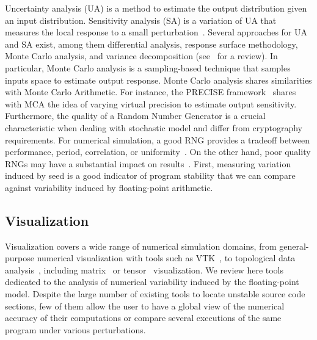 \documentclass[11pt]{article}
\begin{document}
Uncertainty analysis (UA) is a method to estimate the output distribution given an input distribution.
Sensitivity analysis (SA) is a variation of UA that measures the local response to a small perturbation~\cite{loucks2017water}. 
Several approaches for UA and SA exist, among them differential analysis, response surface methodology, Monte Carlo analysis, and variance decomposition (see~\cite{helton2006survey} for a review). In particular, Monte Carlo analysis is a sampling-based technique that samples inputs space to estimate output response. Monte Carlo analysis shares similarities with Monte Carlo Arithmetic. For instance, the PRECISE framework~\cite{chaitin1996lectures} shares with MCA the idea of varying virtual precision to estimate output sensitivity.
Furthermore, the quality of a Random Number Generator is a crucial characteristic when dealing with stochastic model and differ from cryptography requirements. For numerical simulation, a good RNG provides a tradeoff between performance, period, correlation, or uniformity~\cite{james2020review}. On the other hand, poor quality RNGs may have a substantial impact on results~\cite{click2011quality}. First, measuring variation induced by seed is a good indicator of program stability that we can compare against variability induced by floating-point arithmetic.


\subsection{Visualization}

Visualization covers a wide range of numerical simulation domains, from general-purpose numerical visualization with tools
such as VTK~\cite{schroeder2000visualizing}, to topological data analysis~\cite{tierny2018topological}, including matrix~\cite{wu2008matrix} or tensor~\cite{kindlmann2006diffusion} visualization.
We review here tools dedicated to the analysis of numerical variability induced by the floating-point model. Despite the large number of existing tools  to locate unstable source code sections, few of them allow the user to have a global view of the numerical accuracy of their computations or compare several executions of the same program under various perturbations.
\end{document}
